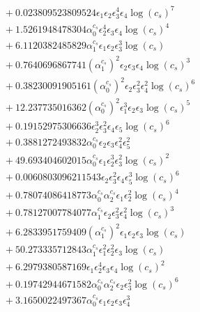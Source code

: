 \documentclass[10pt]{article}
\begin{document}
\begin{align*}
&{}  + 0.023809523809524 \epsilon_{1} \epsilon_{2} \epsilon_{3}^{4} \epsilon_{4} \log{\left(c_{s} \right)}^{7} \\
&{}  + 1.5261948478304 \alpha_{0}^{c_s} \epsilon_{2}^{4} \epsilon_{3} \epsilon_{4} \log{\left(c_{s} \right)}^{4} \\
&{}  + 6.1120382485829 \alpha_{1}^{c_s} \epsilon_{1} \epsilon_{2} \epsilon_{3}^{3} \log{\left(c_{s} \right)} \\
&{}  + 0.7640696867741 \left(\alpha_{1}^{c_s}\right)^{2} \epsilon_{2} \epsilon_{3} \epsilon_{4} \log{\left(c_{s} \right)}^{3} \\
&{}  + 0.38230091905161 \left(\alpha_{0}^{c_s}\right)^{2} \epsilon_{2} \epsilon_{3}^{2} \epsilon_{4}^{2} \log{\left(c_{s} \right)}^{6} \\
&{}  + 12.237735016362 \left(\alpha_{0}^{c_s}\right)^{2} \epsilon_{1}^{3} \epsilon_{2} \epsilon_{3} \log{\left(c_{s} \right)}^{5} \\
&{}  + 0.19152975306636 \epsilon_{2}^{3} \epsilon_{3}^{2} \epsilon_{4} \epsilon_{5} \log{\left(c_{s} \right)}^{6} \\
&{}  + 0.3881272493832 \alpha_{0}^{c_s} \epsilon_{2} \epsilon_{3} \epsilon_{4}^{2} \epsilon_{5}^{2} \\
&{}  + 49.693404602015 \alpha_{0}^{c_s} \epsilon_{1} \epsilon_{2}^{3} \epsilon_{3}^{2} \log{\left(c_{s} \right)}^{2} \\
&{}  + 0.0060803096211543 \epsilon_{2} \epsilon_{3}^{2} \epsilon_{4} \epsilon_{5}^{3} \log{\left(c_{s} \right)}^{6} \\
&{}  + 0.78074086418773 \alpha_{0}^{c_s} \alpha_{2}^{c_s} \epsilon_{1} \epsilon_{2}^{2} \log{\left(c_{s} \right)}^{4} \\
&{}  + 0.78127007784077 \alpha_{1}^{c_s} \epsilon_{2} \epsilon_{3}^{2} \epsilon_{4}^{2} \log{\left(c_{s} \right)}^{3} \\
&{}  + 6.2833951759409 \left(\alpha_{1}^{c_s}\right)^{2} \epsilon_{1} \epsilon_{2} \epsilon_{3} \log{\left(c_{s} \right)} \\
&{}  + 50.273335712843 \alpha_{1}^{c_s} \epsilon_{1}^{2} \epsilon_{2}^{2} \epsilon_{3} \log{\left(c_{s} \right)} \\
&{}  + 6.2979380587169 \epsilon_{1} \epsilon_{2}^{4} \epsilon_{3} \epsilon_{4} \log{\left(c_{s} \right)}^{2} \\
&{}  + 0.19742944671582 \alpha_{0}^{c_s} \alpha_{2}^{c_s} \epsilon_{2} \epsilon_{3}^{2} \log{\left(c_{s} \right)}^{6} \\
&{}  + 3.1650022497367 \alpha_{0}^{c_s} \epsilon_{1} \epsilon_{2} \epsilon_{3} \epsilon_{4}^{3} \\

\end{align*}
\end{document}
